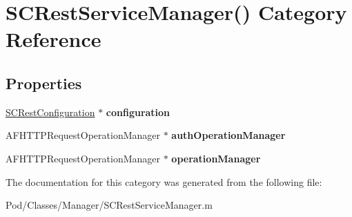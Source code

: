 \hypertarget{category_s_c_rest_service_manager_07_08}{}\section{S\+C\+Rest\+Service\+Manager() Category Reference}
\label{category_s_c_rest_service_manager_07_08}
\subsection*{Properties}
\begin{DoxyCompactItemize}
\item 
\hyperlink{interface_s_c_rest_configuration}{S\+C\+Rest\+Configuration} $\ast$ {\bfseries configuration}\hypertarget{category_s_c_rest_service_manager_07_08_a8293dee8dd7827b16895577c600ee9d9}{}\label{category_s_c_rest_service_manager_07_08_a8293dee8dd7827b16895577c600ee9d9}

\item 
A\+F\+H\+T\+T\+P\+Request\+Operation\+Manager $\ast$ {\bfseries auth\+Operation\+Manager}\hypertarget{category_s_c_rest_service_manager_07_08_a985efac999069f8e103df2fa136e2dbf}{}\label{category_s_c_rest_service_manager_07_08_a985efac999069f8e103df2fa136e2dbf}

\item 
A\+F\+H\+T\+T\+P\+Request\+Operation\+Manager $\ast$ {\bfseries operation\+Manager}\hypertarget{category_s_c_rest_service_manager_07_08_a6a0b36f7f42d0707664c0e46813fca0c}{}\label{category_s_c_rest_service_manager_07_08_a6a0b36f7f42d0707664c0e46813fca0c}

\end{DoxyCompactItemize}


The documentation for this category was generated from the following file\+:\begin{DoxyCompactItemize}
\item 
Pod/\+Classes/\+Manager/S\+C\+Rest\+Service\+Manager.\+m\end{DoxyCompactItemize}
